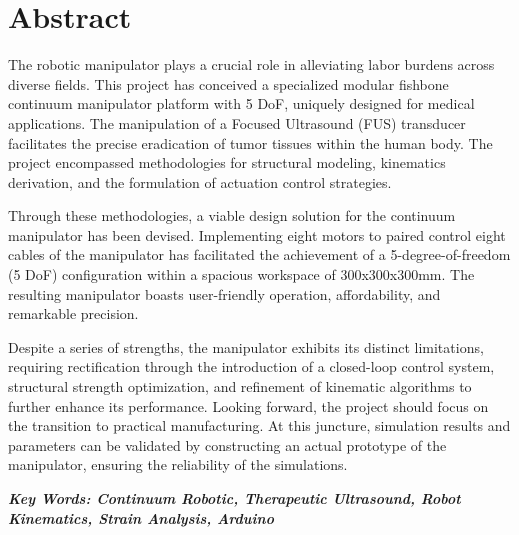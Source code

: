 \section*{Abstract} 
The robotic manipulator plays a crucial role in alleviating labor burdens across diverse fields. This project has conceived a 
specialized modular fishbone continuum manipulator platform with 5 DoF, uniquely designed for medical applications. The 
manipulation of a Focused Ultrasound (FUS) transducer facilitates the precise eradication of tumor tissues within the human body.
The project encompassed methodologies for structural modeling, kinematics derivation, and the formulation of actuation control strategies.

Through these methodologies, a viable design solution for the continuum manipulator has been devised.  Implementing eight motors 
to paired control eight cables of the manipulator has facilitated the achievement of a 5-degree-of-freedom (5 DoF) 
configuration within a spacious workspace of 300x300x300mm. The resulting manipulator boasts user-friendly operation, affordability, 
and remarkable precision. 

Despite a series of strengths,  the manipulator exhibits its distinct limitations, requiring rectification through the 
introduction of a closed-loop control system, structural strength optimization, and refinement of kinematic algorithms 
to further enhance its performance. Looking forward, the project should focus on the transition to practical manufacturing. 
At this juncture, simulation results and parameters can be validated by constructing an actual prototype of the manipulator, 
ensuring the reliability of the simulations.


\vfill


\textbf{\emph{Key Words: Continuum Robotic, Therapeutic Ultrasound, Robot Kinematics, Strain Analysis, Arduino}}
\vspace{0.8cm}
\setcounter{page}{1}
\newpage